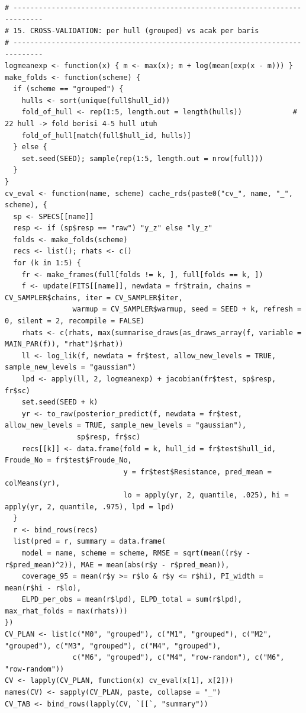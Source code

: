 \documentclass[
]{article}
\begin{document}
\begin{verbatim}
# -----------------------------------------------------------------------------
# 15. CROSS-VALIDATION: per hull (grouped) vs acak per baris
# -----------------------------------------------------------------------------
logmeanexp <- function(x) { m <- max(x); m + log(mean(exp(x - m))) }
make_folds <- function(scheme) {
  if (scheme == "grouped") {
    hulls <- sort(unique(full$hull_id))
    fold_of_hull <- rep(1:5, length.out = length(hulls))            # 22 hull -> fold berisi 4-5 hull utuh
    fold_of_hull[match(full$hull_id, hulls)]
  } else {
    set.seed(SEED); sample(rep(1:5, length.out = nrow(full)))
  }
}
cv_eval <- function(name, scheme) cache_rds(paste0("cv_", name, "_", scheme), {
  sp <- SPECS[[name]]
  resp <- if (sp$resp == "raw") "y_z" else "ly_z"
  folds <- make_folds(scheme)
  recs <- list(); rhats <- c()
  for (k in 1:5) {
    fr <- make_frames(full[folds != k, ], full[folds == k, ])
    f <- update(FITS[[name]], newdata = fr$train, chains = CV_SAMPLER$chains, iter = CV_SAMPLER$iter,
                warmup = CV_SAMPLER$warmup, seed = SEED + k, refresh = 0, silent = 2, recompile = FALSE)
    rhats <- c(rhats, max(summarise_draws(as_draws_array(f, variable = MAIN_PAR(f)), "rhat")$rhat))
    ll <- log_lik(f, newdata = fr$test, allow_new_levels = TRUE, sample_new_levels = "gaussian")
    lpd <- apply(ll, 2, logmeanexp) + jacobian(fr$test, sp$resp, fr$sc)
    set.seed(SEED + k)
    yr <- to_raw(posterior_predict(f, newdata = fr$test, allow_new_levels = TRUE, sample_new_levels = "gaussian"),
                 sp$resp, fr$sc)
    recs[[k]] <- data.frame(fold = k, hull_id = fr$test$hull_id, Froude_No = fr$test$Froude_No,
                            y = fr$test$Resistance, pred_mean = colMeans(yr),
                            lo = apply(yr, 2, quantile, .025), hi = apply(yr, 2, quantile, .975), lpd = lpd)
  }
  r <- bind_rows(recs)
  list(pred = r, summary = data.frame(
    model = name, scheme = scheme, RMSE = sqrt(mean((r$y - r$pred_mean)^2)), MAE = mean(abs(r$y - r$pred_mean)),
    coverage_95 = mean(r$y >= r$lo & r$y <= r$hi), PI_width = mean(r$hi - r$lo),
    ELPD_per_obs = mean(r$lpd), ELPD_total = sum(r$lpd), max_rhat_folds = max(rhats)))
})
CV_PLAN <- list(c("M0", "grouped"), c("M1", "grouped"), c("M2", "grouped"), c("M3", "grouped"), c("M4", "grouped"),
                c("M6", "grouped"), c("M4", "row-random"), c("M6", "row-random"))
CV <- lapply(CV_PLAN, function(x) cv_eval(x[1], x[2]))
names(CV) <- sapply(CV_PLAN, paste, collapse = "_")
CV_TAB <- bind_rows(lapply(CV, `[[`, "summary"))


\end{verbatim}
\end{document}

